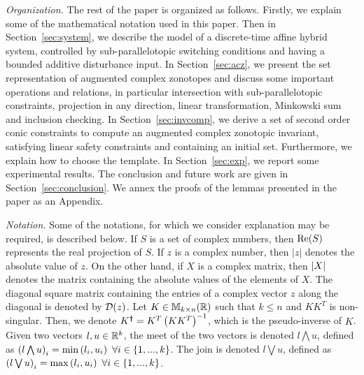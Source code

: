 \emph{Organization.}  The rest of the paper is organized as follows.  Firstly, we explain
some of the mathematical notation used in this paper.  Then in
Section~\ref{sec:system}, we describe the model of a discrete-time
affine hybrid system, controlled by sub-parallelotopic switching
conditions and having a bounded additive disturbance input. In
Section~\ref{sec:acz}, we present the set representation of augmented
complex zonotopes and discuss some important operations and relations, in particular intersection with sub-parallelotopic constraints, projection in any direction, linear transformation, Minkowski sum and inclusion checking.  In
Section~\ref{sec:invcomp}, we derive a set of second order conic
constraints to compute an augmented complex zonotopic invariant,
satisfying linear safety constraints and containing an initial set.
Furthermore, we explain how to choose the template.  In
Section~\ref{sec:exp}, we report some experimental results.  The
conclusion and future work are given in Section~\ref{sec:conclusion}.
We annex the proofs of the lemmas presented in the paper as an
Appendix.

\emph{Notation.} Some of the notations, for which we
consider explanation may be required, is described below.  If $S$ is a
set of complex numbers, then $\operatorname{\operatorname{Re}}(S)$ represents the real projection
of $S$.  If $z$ is a complex number, then $|z|$ denotes the absolute
value of $z$.  On the other hand, if $X$ is a complex matrix, then
$\left|X\right|$ denotes the matrix containing the absolute values of the
elements of $X$.  The diagonal square matrix containing the entries of
a complex vector $z$ along the diagonal is denoted by $\mathcal{D}(z)$.  Let
$K\in\mathbb{M}_{k\times n}(\mathbb{\mathbb{R}})$ such that $k\leq n$ and $KK^T$ is
non-singular.  Then, we denote $K^{\bm{\dagger}}=K^T\left(KK^T\right)^{-1}$, which
is the pseudo-inverse of $K$.  Given two vectors $l,u\in\mathbb{R}^k$,
the meet of the two vectors is denoted $l\bigwedge u$, defined as
$\left(l\bigwedge u\right)_i=\min\left(l_i,u_i\right)~\forall i\in\{1,...,k\}$.  The
join is denoted $l\bigvee u$, defined as $\left(l\bigvee
u\right)_i=\max\left(l_i,u_i\right)~\forall i\in\{1,...,k\}$.
